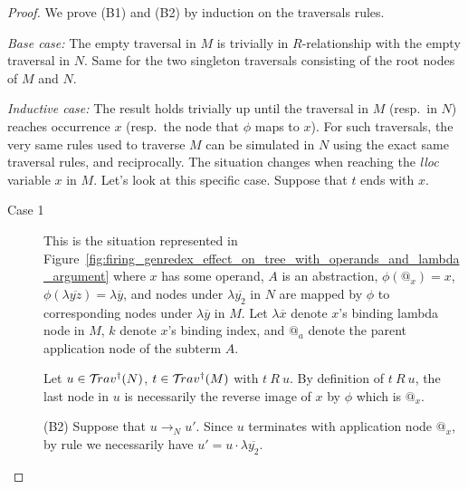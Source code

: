 \documentclass{article}
\theoremstyle{definition}
\begin{document}
\begin{proof}
We prove (B1) and (B2) by induction on the traversals rules.

\emph{Base case:} The empty traversal in $M$ is trivially in $R$-relationship with the empty traversal in $N$. Same for the two singleton traversals consisting of the root nodes of $M$ and $N$.

\emph{Inductive case:}
The result holds trivially up until the traversal in $M$ (resp.~in $N$) reaches  occurrence $x$ (resp.~the node that $\phi$ maps to $x$). For such traversals, the very same rules used to traverse $M$ can be simulated in $N$ using the exact same traversal rules, and reciprocally. The situation changes when reaching the \emph{lloc} variable $x$ in $M$. Let's look at this specific case.
Suppose that $t$ ends with $x$.

\begin{description}
\item[Case 1] This is the situation represented in Figure~\ref{fig:firing_genredex_effect_on_tree_with_operands_and_lambda_argument} where $x$ has some operand, $A$ is an abstraction, $\phi(@_x) = x$, $\phi(\lambda\overline{yz}) = \lambda\overline{y}$, and nodes under
$\lambda\overline{y_2}$ in $N$ are mapped by $\phi$ to corresponding nodes under $\lambda\overline{y}$ in $M$. Let $\lambda\overline{x}$ denote $x$'s binding lambda node in $M$, $k$ denote $x$'s binding index, and $@_a$ denote the parent application node of the subterm $A$.

Let $u\in \mathcal{T}\!rav^\dagger(N)$, $t\in\mathcal{T}\!rav^\dagger(M)$ with $t~R~u$.
By definition of $t~R~u$, the last node in $u$ is necessarily the reverse image of $x$ by $\phi$ which is $@_x$.

(B2) Suppose that $u \rightarrow_N u'$. Since $u$ terminates with application node $@_x$, by rule  we necessarily have $u' = u \cdot \lambda\overline{y_2}$.


\end{description}
\end{proof}
\end{document}
